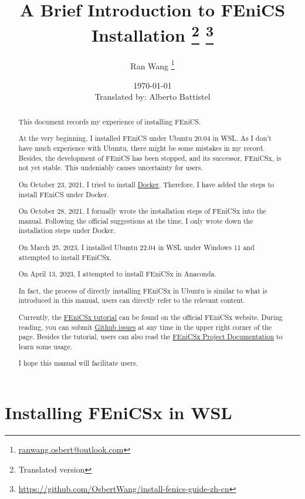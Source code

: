 \documentclass{report}
\title{\bfseries A Brief Introduction to FEniCS Installation%
	\thanks{Translated version}
	\thanks{\url{https://github.com/OsbertWang/install-fenics-guide-zh-cn}}%
}
\author{Ran Wang%
	\thanks{\href{mailto:ranwang.osbert@outlook.com}%
		{\ttfamily ranwang.osbert@outlook.com}}%
}
\date{\today \\
Translated by: Alberto Battistel}
\begin{document}
	
	\maketitle
	
	\begin{abstract}
		
		This document records my experience of installing FEniCS.
		
		At the very beginning, I installed FEniCS under Ubuntu 20.04 in WSL. As I don't have much experience with Ubuntu, there might be some mistakes in my record. Besides, the development of FEniCS has been stopped, and its successor, FEniCSx, is not yet stable. This undeniably causes uncertainty for users.
		
		On October 23, 2021, I tried to install \href{https://www.docker.com/get-started}{Docker}. Therefore, I have added the steps to install FEniCS under Docker.
		
		On October 28, 2021, I formally wrote the installation steps of FEniCSx into the manual. Following the official suggestions at the time, I only wrote down the installation steps under Docker.
		
		On March 25, 2023, I installed Ubuntu 22.04 in WSL under Windows 11 and attempted to install FEniCSx.
		
		On April 13, 2023, I attempted to install FEniCSx in Anaconda.
		
		In fact, the process of directly installing FEniCSx in Ubuntu is similar to what is introduced in this manual, users can directly refer to the relevant content.
		
		Currently, the \href{https://jsdokken.com/dolfinx-tutorial/}{FEniCSx tutorial} can be found on the official FEniCSx website. During reading, you can submit \href{https://github.com/jorgensd/ dolfinx-tutorial/issues/new?title=Issue%20on%20page%20%2Findex.html& body=Your%20issue%20content%20here.}{Github issues} at any time in the upper right corner of the page. Besides the tutorial, users can also read the \href{https://docs.fenicsproject.org/}{FEniCSx Project Documentation} to learn some usage.
		
		I hope this manual will facilitate users.
	\end{abstract}

\tableofcontents

\chapter{Installing FEniCSx in WSL}
\end{document}
